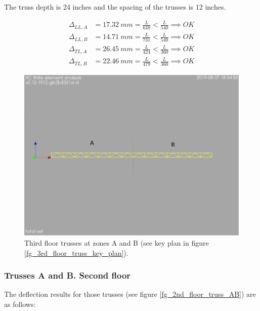 \noindent The truss depth is 24 inches and the spacing of the trusses is 12 inches.

\begin{align}
\Delta_{LL,A} &= 17.32\ mm= \frac{L}{648} < \frac{L}{540} \implies OK \\
\Delta_{LL,B} &= 14.71\ mm= \frac{L}{731} < \frac{L}{540} \implies OK \\
\Delta_{TL,A} &= 26.45\ mm= \frac{L}{424} < \frac{L}{360} \implies OK \\
\Delta_{TL,B} &= 22.46\ mm= \frac{L}{479} < \frac{L}{360} \implies OK
\end{align}


\begin{figure}
  \begin{center}
  \includegraphics[width=120mm]{figures/trusses/floor_truss_AB}
  \end{center}
  \caption{Third floor trusses at zones A and B (see key plan in figure \ref{fg_3rd_floor_truss_key_plan}).}\label{fg_floor_truss_AB}
\end{figure}

\subsubsection{Trusses A and B. Second floor}
The deflection results for those trusses (see figure \ref{fg_2nd_floor_truss_AB}) are as follows:

